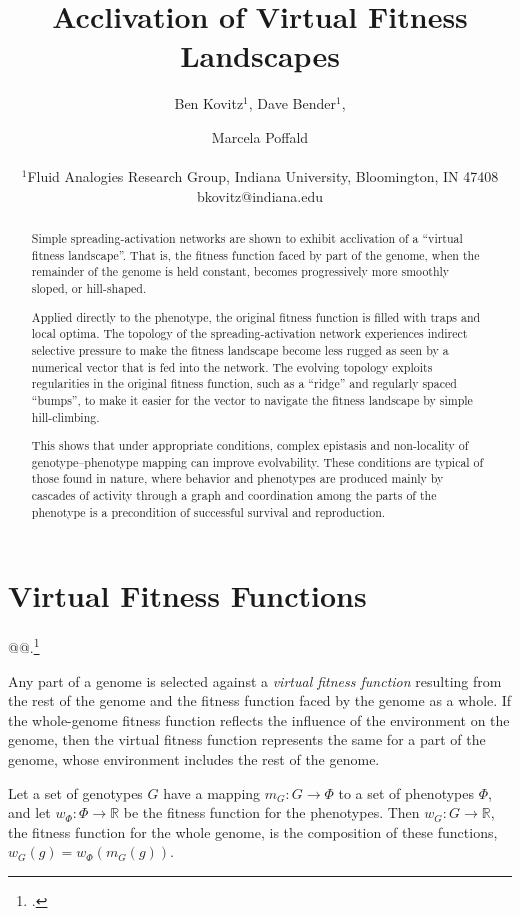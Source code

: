 \documentclass[letterpaper]{article}
\title{Acclivation of Virtual Fitness Landscapes}
\author{Ben Kovitz$^{1}$, Dave Bender$^{1}$, \and Marcela Poffald \\
\mbox{}\\
$^1$Fluid Analogies Research Group, Indiana University, Bloomington, IN 47408 \\
bkovitz@indiana.edu}
\begin{document}
\maketitle

\begin{abstract}
Simple spreading-activation networks are shown to exhibit acclivation of a
``virtual fitness landscape''. That is, the fitness function faced by part of
the genome, when the remainder of the genome is held constant, becomes
progressively more smoothly sloped, or hill-shaped.

Applied directly to the phenotype, the original fitness function is filled
with traps and local optima. The topology of the spreading-activation network
experiences indirect selective pressure to make the fitness landscape become
less rugged as seen by a numerical vector that is fed into the network.
The evolving topology exploits regularities in the original fitness
function, such as a ``ridge'' and regularly spaced ``bumps'', to make it
easier for the vector to navigate the fitness landscape by simple
hill-climbing.

This shows that under appropriate conditions, complex \mbox{epistasis} and
non-locality of genotype--phenotype mapping can improve evolvability. These
conditions are typical of those found in nature, where behavior and phenotypes
are produced mainly by cascades of activity through a graph and coordination
among the parts of the phenotype is a precondition of successful survival and
reproduction.

\end{abstract}

%

\section{Virtual Fitness Functions}
@@.\footnote{\cite{hogeweg2012toward}.}

Any part of a genome is selected against a \textit{virtual fitness function}
resulting from the rest of the genome and the fitness function faced by the
genome as a whole. If the whole-genome fitness function reflects the influence
of the environment on the genome, then the virtual fitness function represents
the same for a part of the genome, whose environment includes the rest of
the genome.

Let a set of genotypes $G$ have a mapping $m_{G} : G \rightarrow \Phi$ to a set
of phenotypes $\Phi$, and let $w_\Phi : \Phi \rightarrow \mathbb{R}$ be the
fitness function for the phenotypes. Then $w_G : G \rightarrow \mathbb{R}$, the
fitness function for the whole genome, is the composition of these functions,
$w_G(g) = w_\Phi(m_{G}(g))$.
\end{document}
